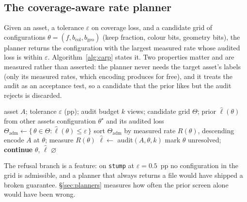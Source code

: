 \documentclass[preprint,number,3p]{elsarticle}
\newcommand{\carp}{\textsc{Carp}}
\begin{document}
\subsection{The coverage-aware rate planner}
\label{sec:planner}

Given an asset, a tolerance $\varepsilon$ on coverage loss, and a candidate grid of configurations
$\theta = (f, b_{\mathrm{col}}, b_{\mathrm{geo}})$ (keep fraction, colour bits, geometry bits), the planner returns the
configuration with the largest measured rate whose audited loss is within $\varepsilon$. Algorithm~\ref{alg:carp}
states it. Two properties matter and are measured rather than asserted: the planner never needs the target asset's
labels (only its measured rates, which encoding produces for free), and it treats the audit as an acceptance test,
so a candidate that the prior likes but the audit rejects is discarded.

\begin{algorithm}[t]
\caption{\carp{}: coverage-aware rate planning for one asset}
\label{alg:carp}
\begin{algorithmic}[1]
\Require asset $A$; tolerance $\varepsilon$ (pp); audit budget $k$ views; candidate grid $\Theta$;
         prior $\hat{\ell}(\theta)$ from other assets
\Ensure configuration $\theta^\star$ and its audited loss
\State $\Theta_{\mathrm{adm}} \gets \{\,\theta \in \Theta : \hat{\ell}(\theta) \le \varepsilon\,\}$ 
\State sort $\Theta_{\mathrm{adm}}$ by measured rate $R(\theta)$, descending
  \State encode $A$ at $\theta$; measure $R(\theta)$ 
  \State $\hat{\ell} \gets$ audit$(A, \theta, k)$ 
  \If{$|\hat{\ell} - \varepsilon| \le \delta$}
     \State mark $\theta$ unresolved; \textbf{continue}
  \EndIf
  \If{$\hat{\ell} \le \varepsilon$}
     \State \Return $\theta$, $\hat{\ell}$
  \EndIf
\EndFor
\State \Return $\varnothing$ 
\end{algorithmic}
\end{algorithm}

The refusal branch is a feature: on \texttt{stump} at $\varepsilon = 0.5$~pp no configuration in the grid is
admissible, and a planner that always returns a file would have shipped a broken guarantee. \S\ref{sec:planners}
measures how often the prior screen alone would have been wrong.
\end{document}
